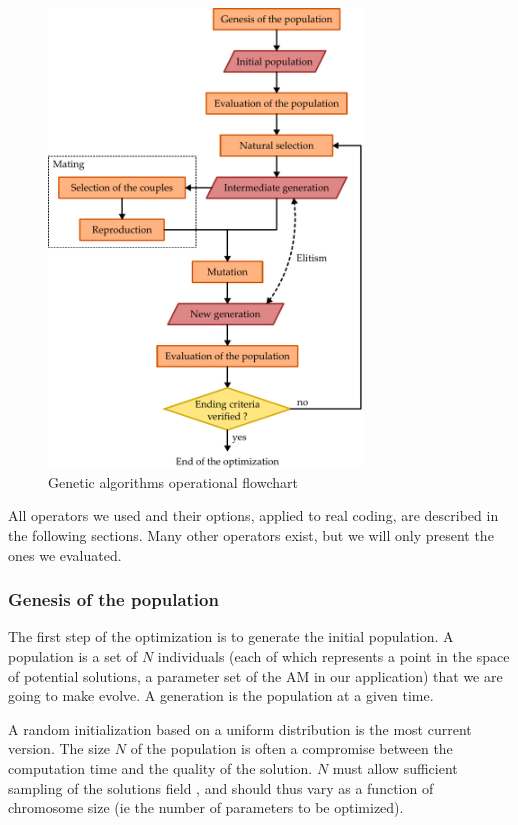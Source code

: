 \documentclass[twocol]{ametsoc}
\begin{document}
\begin{figure}[htb]
	\includegraphics[width=8.3cm]{figures/figure_structure_gas.pdf}
	\caption{Genetic algorithms operational flowchart}
	\label{fig:structure_gas}
\end{figure}

All operators we used and their options, applied to real coding, are described in the following sections. Many other operators exist, but we will only present the ones we evaluated.

\subsubsection{Genesis of the population}

The first step of the optimization is to generate the initial population. A population is a set of $N$ individuals (each of which represents a point in the space of potential solutions, a parameter set of the AM in our application) that we are going to make evolve. A generation is the population at a given time. 

A random initialization based on a uniform distribution is the most current version. The size $N$ of the population is often a compromise between the computation time and the quality of the solution. $N$ must allow sufficient sampling of the solutions field \citep{Beasley1996a}, and should thus vary as a function of chromosome size (ie the number of parameters to be optimized). 
\end{document}

